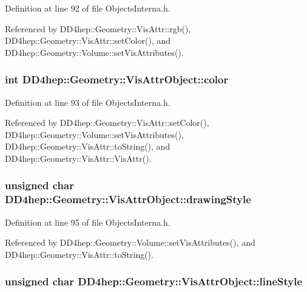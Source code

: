 Definition at line 92 of file ObjectsInterna.h.

Referenced by DD4hep::Geometry::VisAttr::rgb(), DD4hep::Geometry::VisAttr::setColor(), and DD4hep::Geometry::Volume::setVisAttributes().\hypertarget{class_d_d4hep_1_1_geometry_1_1_vis_attr_object_a1bff0c73a37bb6791006a4f0761d9f3a}{
\subsubsection[{color}]{\setlength{\rightskip}{0pt plus 5cm}int {\bf DD4hep::Geometry::VisAttrObject::color}}}
\label{class_d_d4hep_1_1_geometry_1_1_vis_attr_object_a1bff0c73a37bb6791006a4f0761d9f3a}


Definition at line 93 of file ObjectsInterna.h.

Referenced by DD4hep::Geometry::VisAttr::setColor(), DD4hep::Geometry::Volume::setVisAttributes(), DD4hep::Geometry::VisAttr::toString(), and DD4hep::Geometry::VisAttr::VisAttr().\hypertarget{class_d_d4hep_1_1_geometry_1_1_vis_attr_object_ac6a253b99e112880c1ef727f9b9f9e73}{
\subsubsection[{drawingStyle}]{\setlength{\rightskip}{0pt plus 5cm}unsigned char {\bf DD4hep::Geometry::VisAttrObject::drawingStyle}}}
\label{class_d_d4hep_1_1_geometry_1_1_vis_attr_object_ac6a253b99e112880c1ef727f9b9f9e73}


Definition at line 95 of file ObjectsInterna.h.

Referenced by DD4hep::Geometry::Volume::setVisAttributes(), and DD4hep::Geometry::VisAttr::toString().\hypertarget{class_d_d4hep_1_1_geometry_1_1_vis_attr_object_aaede923ed352bb5f43a809f6943f2061}{
\subsubsection[{lineStyle}]{\setlength{\rightskip}{0pt plus 5cm}unsigned char {\bf DD4hep::Geometry::VisAttrObject::lineStyle}}}
\label{class_d_d4hep_1_1_geometry_1_1_vis_attr_object_aaede923ed352bb5f43a809f6943f2061}



